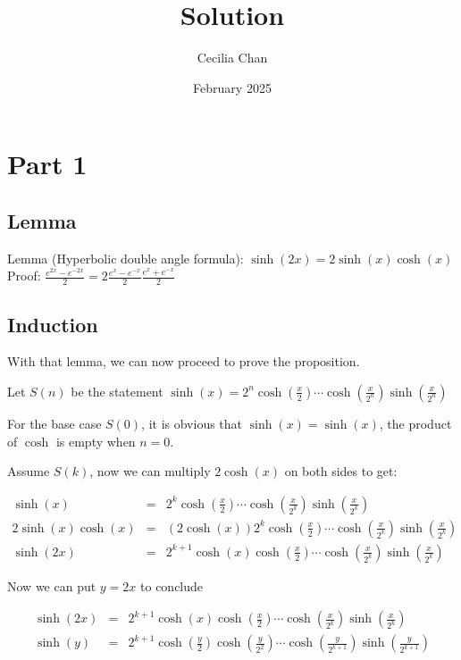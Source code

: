 \documentclass{article}
\title{Solution}
\author{Cecilia Chan}
\date{February 2025}
\begin{document}
\maketitle
\section*{Part 1}
\subsection*{Lemma}
Lemma (Hyperbolic double angle formula): $ \sinh(2x) = 2\sinh(x)\cosh(x)$ \\

Proof: $ \frac{e^{2x} - e^{-2x}}{2} = 2\frac{e^{x} - e^{-x}}{2}\frac{e^{x} + e^{-x}}{2}$ \\

\subsection*{Induction}
With that lemma, we can now proceed to prove the proposition.

Let $ S(n) $ be the statement $ \sinh(x) = 2^n \cosh(\frac{x}{2}) \cdots \cosh(\frac{x}{2^n}) \sinh(\frac{x}{2^n}) $

For the base case $ S(0) $, it is obvious that $ \sinh(x) = \sinh(x) $, the product of $ \cosh $ is empty when $ n = 0 $.

Assume $S(k)$, now we can multiply $ 2 \cosh(x) $ on both sides to get:

\begin{eqnarray*}
               \sinh(x) &=& 2^k \cosh(\frac{x}{2}) \cdots \cosh(\frac{x}{2^k}) \sinh(\frac{x}{2^k}) \\
    2 \sinh(x) \cosh(x) &=& (2 \cosh(x)) 2^k  \cosh(\frac{x}{2}) \cdots \cosh(\frac{x}{2^k}) \sinh(\frac{x}{2^k}) \\
              \sinh(2x) &=& 2^{k+1} \cosh(x) \cosh(\frac{x}{2}) \cdots \cosh(\frac{x} {2^k})\sinh(\frac{x}{2^k})
\end{eqnarray*}

Now we can put $ y = 2x $ to conclude

\begin{eqnarray*}
   \sinh(2x) &=& 2^{k+1} \cosh(x) \cosh(\frac{x}{2}) \cdots \cosh(\frac{x}{2^k}) \sinh(\frac{x}{2^k}) \\
    \sinh(y) &=& 2^{k+1} \cosh(\frac{y}{2}) \cosh(\frac{y}{2^2}) \cdots \cosh(\frac{y}{2^{k+1}}) \sinh(\frac{y}{2^{k+1}})
\end{eqnarray*}
\end{document}
